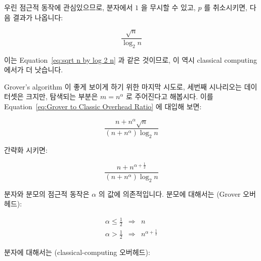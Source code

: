 우린 점근적 동작에 관심있으므로, 분자에서 $1$ 을 무시할 수 있고, $p$ 를
취소시키면, 다음 결과가 나옵니다:

\begin{equation}
	\frac{\sqrt n}{\log_2 n}
\end{equation}

이는 Equation~\ref{eq:sqrt n by log 2 n} 과 같은 것이므로, 이 역시 classical
computing 에서가 더 낫습니다.

Grover's algorithm 이 좋게 보이게 하기 위한 마지막 시도로, 세번째 시나리오는
데이터셋은 크지만, 탐색되는 부분은 $m = n^\alpha$ 로 주어진다고 해봅시다.
이를
Equation~\ref{eq:Grover to Classic Overhead Ratio}
에 대입해 보면:

\begin{equation}
	\frac{n + n^\alpha \sqrt n}{\left( n + n^\alpha \right) \log_2 n}
\end{equation}

간략화 시키면:

\begin{equation}
	\frac{n + n^{\alpha + \frac{1}{2}}}{\left( n + n^\alpha \right) \log_2 n}
\end{equation}

분자와 분모의 점근적 동작은 $\alpha$ 의 값에 의존적입니다.
분모에 대해서는 (Grover 오버헤드):

\begin{eqnarray}
	\alpha \leq \frac{1}{2} & \Rightarrow & n \\
	\alpha > \frac{1}{2} & \Rightarrow & n^{\alpha + \frac{1}{2}}
\end{eqnarray}

분자에 대해서는 (classical-computing 오버헤드):
\iffalse

